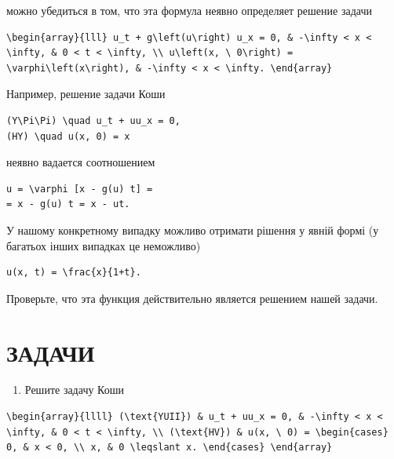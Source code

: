 \documentclass[
  ukrainian,
]{article}
\providecommand{\tightlist}{%
  \setlength{\itemsep}{0pt}\setlength{\parskip}{0pt}}
\begin{document}
можно убедиться в том, что эта формула неявно определяет решение задачи

\begin{verbatim}
\begin{array}{lll} u_t + g\left(u\right) u_x = 0, & -\infty < x < \infty, & 0 < t < \infty, \\ u\left(x, \ 0\right) = \varphi\left(x\right), & -\infty < x < \infty. \end{array}
\end{verbatim}

Например, решение задачи Коши

\begin{verbatim}
(Y\Pi\Pi) \quad u_t + uu_x = 0,
(HY) \quad u(x, 0) = x
\end{verbatim}

неявно вадается соотношением

\begin{verbatim}
u = \varphi [x - g(u) t] =
= x - g(u) t = x - ut.
\end{verbatim}

У нашому конкретному випадку можливо отримати рішення у явній формі (у
багатьох інших випадках це неможливо)

\begin{verbatim}
u(x, t) = \frac{x}{1+t}.
\end{verbatim}

Проверьте, что эта функция действительно является решением нашей задачи.

\section{\texorpdfstring{\textbf{ЗАДАЧИ}}{ЗАДАЧИ}}\label{ux437ux430ux434ux430ux447ux438}

\begin{enumerate}
\def\labelenumi{\arabic{enumi}.}
\tightlist
\item
  Решите задачу Коши
\end{enumerate}

\begin{verbatim}
\begin{array}{llll} (\text{YUII}) & u_t + uu_x = 0, & -\infty < x < \infty, & 0 < t < \infty, \\ (\text{HV}) & u(x, \ 0) = \begin{cases} 0, & x < 0, \\ x, & 0 \leqslant x. \end{cases} \end{array}
\end{verbatim}
\end{document}
